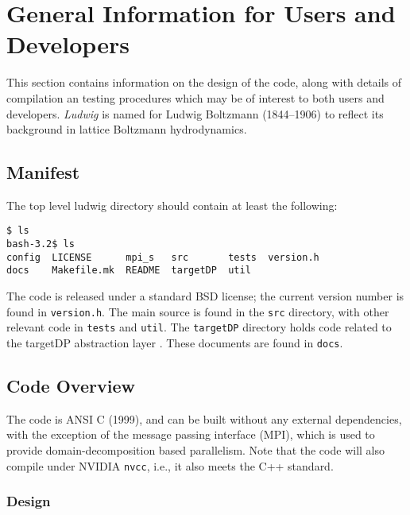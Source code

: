 %
%
%
%
%

\section{General Information for Users and Developers}

This section contains information on the design of the code, along
with details of compilation an testing procedures
which may be of interest to both users and developers.
\textit{Ludwig} is named for Ludwig Boltzmann (1844--1906) to
reflect its background in lattice Boltzmann hydrodynamics.

\subsection{Manifest}

The top level ludwig directory should contain at least the following:
\begin{lstlisting}
$ ls
bash-3.2$ ls
config  LICENSE      mpi_s   src       tests  version.h
docs    Makefile.mk  README  targetDP  util
\end{lstlisting}
The code is released under a standard BSD license; the current version
number is found in \texttt{version.h}. The main source is found in
the \texttt{src} directory, with other relevant code in \texttt{tests}
and \texttt{util}. The \texttt{targetDP} directory holds code related
to the targetDP abstraction layer \cite{gray2013}. These documents are
found in \texttt{docs}.

\subsection{Code Overview}

The code is ANSI C (1999), and can be built without any external
dependencies, with the exception of the message passing interface
(MPI), which is used to provide domain-decomposition based parallelism.
Note that the code will also compile under NVIDIA \texttt{nvcc}, i.e.,
it also meets the C++ standard.

\subsubsection{Design}

